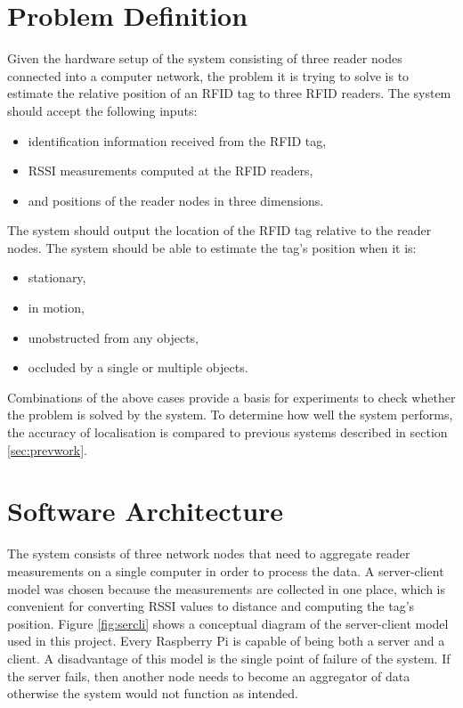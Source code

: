 \section{Problem Definition}
\label{sec:probdef}

Given the hardware setup of the system consisting of three reader nodes connected into a computer network, the problem it is trying to solve is to estimate the relative position of an RFID tag to three RFID readers. The system should accept the following inputs:
\begin{itemize}
	\item identification information received from the RFID tag,
	\item RSSI measurements computed at the RFID readers,
	\item and positions of the reader nodes in three dimensions.
\end{itemize}
The system should output the location of the RFID tag relative to the reader nodes. The system should be able to estimate the tag's position when it is:
\begin{itemize}
 	\item stationary,
 	\item in motion,
 	\item unobstructed from any objects,
 	\item occluded by a single or multiple objects. 
\end{itemize}

Combinations of the above cases provide a basis for experiments to check whether the problem is solved by the system. To determine how well the system performs, the accuracy of localisation is compared to previous systems described in section \ref{sec:prevwork}.

\section{Software Architecture}
\label{sec:softarch}

The system consists of three network nodes that need to aggregate reader measurements on a single computer in order to process the data. A server-client model was chosen because the measurements are collected in one place, which is convenient for converting RSSI values to distance and computing the tag's position. Figure \ref{fig:sercli} shows a conceptual diagram of the server-client model used in this project. Every Raspberry Pi is capable of being both a server and a client. A disadvantage of this model is the single point of failure of the system. If the server fails, then another node needs to become an aggregator of data otherwise the system would not function as intended.

